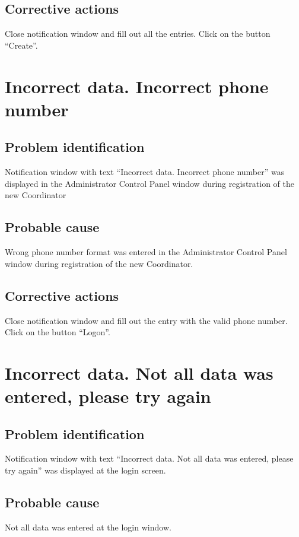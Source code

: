\subsection{Corrective actions}
Close notification window and fill out all the entries. Click on the button
``Create''.


\section{Incorrect data. Incorrect phone number}

\subsection{Problem identification}
Notification window with text ``Incorrect data. Incorrect phone number''
was displayed in the Administrator Control Panel window during registration of
the new Coordinator

\subsection{Probable cause}
Wrong phone number format was entered in the Administrator Control Panel window
during registration of the new Coordinator.

\subsection{Corrective actions}
Close notification window and fill out the entry with the valid phone number.
Click on the button ``Logon''.


\section{Incorrect data. Not all data was entered, please try again}

\subsection{Problem identification}
Notification window with text ``Incorrect data. Not all data was entered, please
try again'' was displayed at the login screen.

\subsection{Probable cause}
Not all data was entered at the login window.

